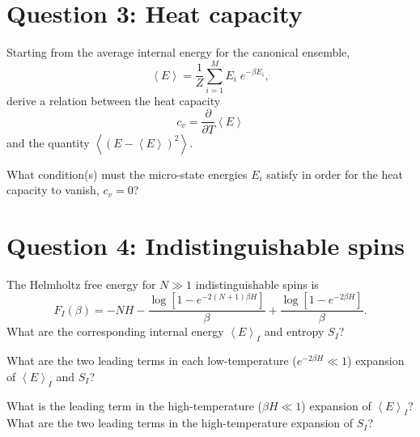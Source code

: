 \documentclass[12 pt]{article} %
\newcommand{\be}{\ensuremath{\beta} }
\newcommand{\vev}[1]{\ensuremath{\left\langle #1 \right\rangle} }
\newcommand{\pderiv}[2]{\ensuremath{\frac{\partial #1}{\partial #2}} }
\newcommand{\showmarks}[1]{\rightline{\texttt{[#1 marks]}}} %
\begin{document}
\showmarks{3}



\vfill
\section*{Question 3: Heat capacity}
Starting from the average internal energy for the canonical ensemble,
\begin{equation*}
  \vev{E} = \frac{1}{Z} \sum_{i = 1}^M E_i \; e^{-\be E_i},
\end{equation*}
derive a relation between the heat capacity
\begin{equation*}
  c_v = \pderiv{}{T} \vev{E}
\end{equation*}
and the quantity $\vev{\left(E - \vev{E}\right)^2}$.

\showmarks{6}

What condition(s) must the micro-state energies $E_i$ satisfy in order for the heat capacity to vanish, $c_v = 0$?

\showmarks{2}



\newpage
\section*{Question 4: Indistinguishable spins}
The Helmholtz free energy for $N \gg 1$ indistinguishable spins is
\begin{equation*}
  F_I(\be) = -NH - \frac{\log\left[1 - e^{-2(N + 1) \be H}\right]}{\be} + \frac{\log\left[1 - e^{-2 \be H}\right]}{\be}.
\end{equation*}
What are the corresponding internal energy $\vev{E}_I$ and entropy $S_I$?

\showmarks{5}

What are the two leading terms in each low-temperature ($e^{-2\be H} \ll 1$) expansion of $\vev{E}_I$ and $S_I$?

\showmarks{5}

What is the leading term in the high-temperature ($\be H \ll 1$) expansion of $\vev{E}_I$?
What are the two leading terms in the high-temperature expansion of $S_I$?

\showmarks{5}



\end{document}
